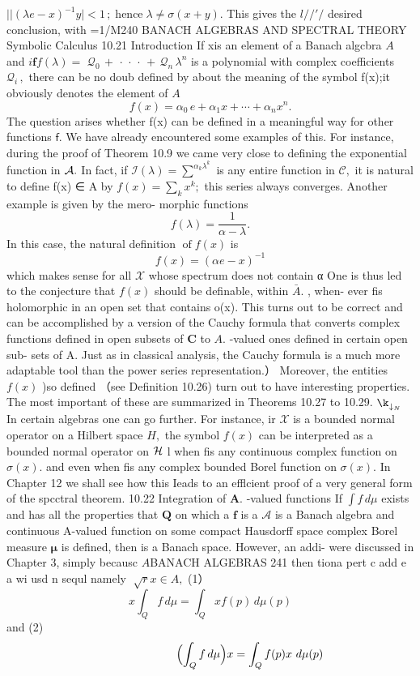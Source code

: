 $|\vert(\lambda e-x)^{-1}y\vert<1\,;\;\mathrm{hence}\;\lambda\not=\sigma(x+y).$ This gives the $l/{\slash{\prime}}/$ desired conclusion, with =1/M240 BANACH ALGEBRAS AND SPECTRAL THEORY Symbolic Calculus 10.21 Introduction If xis an element of a Banach algcbra $\textstyle A$ and $i\mathbf{f}f(\lambda)=$ $\mathcal{Q}_{0}\,+\,\cdot\,\cdot\,\cdot\,+\,\mathcal{Q}_{n}\,\lambda^{n}$ is a polynomial with complex coefficients ${\mathcal{Q}}_{i}\,,$ there can be no doub defined by about the meaning of the symbol f(x);it obviously denotes the element of $\scriptstyle A$ $$ f(x)=\alpha_{0}\,e+\alpha_{1}x+\cdots+\alpha_{n}x^{n}. $$ The question arises whether f(x) can be defined in a meaningful way for other functions ${\boldsymbol{\mathsf{f}}}.$ We have already encountered some examples of this. For instance, during the proof of Theorem 10.9 we came very close to defining the exponential function in ${\cal A}.$ In fact, if ${\mathcal{I}}(\lambda)=\sum^{\alpha_{k}\lambda^{k}}$ is any entire function in ${\mathcal{C}},$ it is natural to define f(x) ∈ A by $f(x)=\sum_{k}x^{k};$ this series always converges. Another example is given by the mero- morphic functions $$ f(\lambda)={\frac{1}{\alpha-\lambda}}. $$ In this case, the natural definition $\operatorname{of}f(x)$ is $$ f(x)=(\alpha e-x)^{-1} $$ which makes sense for all $\scriptstyle{\mathcal{X}}$ whose spectrum does not contain α One is thus led to the conjecture that $\textstyle f(x)$ should be definable, within ${\bar{A}}.$ , when- ever fis holomorphic in an open set that contains o(x). This turns out to be correct and can be accomplished by a version of the Cauchy formula that converts complex functions defined in open subsets of ${\boldsymbol{C}}$ to $A.$ -valued ones defined in certain open sub- sets of A. Just as in classical analysis, the Cauchy formula is a much more adaptable tool than the power series representation.） Moreover, the entities $f(x)$ )so defined （see Definition 10.26) turn out to have interesting properties. The most important of these are summarized in Theorems 10.27 to 10.29. $\operatorname{\k}_{\downarrow_{N}}^{}$ In certain algebras one can go further. For instance, ir $\scriptstyle{\mathcal{X}}$ is a bounded normal operator on a Hilbert space $\textstyle H,$ the symbol $\scriptstyle{f(x)}$ can be interpreted as a bounded normal operator on ${\cal H}$ l when fis any continuous complex function on $\sigma(x).$ and even when fis any complex bounded Borel function on $\sigma(x).$ In Chapter 12 we shall see how this Ieads to an efflcient proof of a very general form of the spcctral theorem. 10.22 Integration of $\mathbf{A}.$ -valued functions If $\int f\,d\mu$ exists and has all the properties that ${\boldsymbol{Q}}$ on which a $\boldsymbol{f}$ is a $\textstyle{\mathcal{A}}$ is a Banach algebra and continuous A-valued function on some compact Hausdorff space complex Borel measure $\boldsymbol{\mu}$ is defined, then is a Banach space. However, an addi- were discussed in Chapter 3, simply becausc $\textstyle A$BANACH ALGEBRAS 241 then tiona pert c add e a wi usd n sequl namely $\;{\sqrt{r}}x\in A,$ (1） $$ x\int_{Q}f\,d\mu=\int_{Q}x f(p)\,d\mu(p) $$ and (2) $$ \quad\quad\quad\quad\quad\quad\quad\Bigl(\int_{Q}f\,d\mu\Bigr)x=\int_{Q}f(p)x\ d\mu(p) $$ 